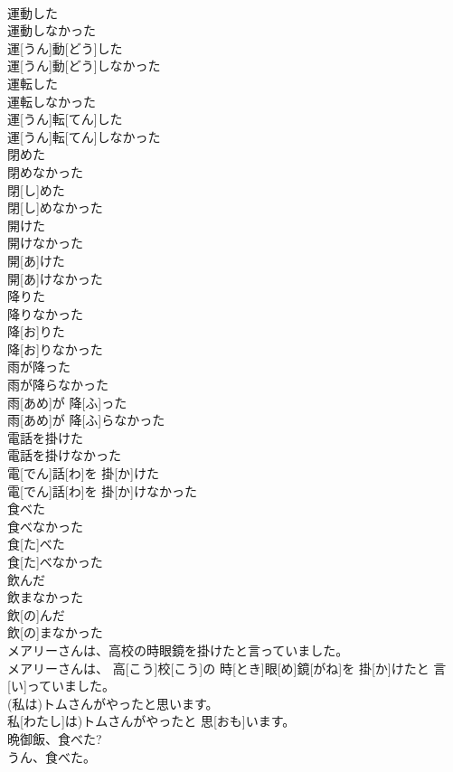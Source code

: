 \documentclass[8pt]{extreport}
\begin{document}
\begin{CJK}{UTF8}{min}
\\	運動した 
\\	運動しなかった	
\\	運[うん]動[どう]した 
\\	運[うん]動[どう]しなかった
\\	運転した 
\\	運転しなかった	
\\	運[うん]転[てん]した 
\\	運[うん]転[てん]しなかった
\\	閉めた 
\\	閉めなかった	
\\	閉[し]めた 
\\	閉[し]めなかった
\\	開けた 
\\	開けなかった	
\\	開[あ]けた 
\\	開[あ]けなかった
\\	降りた 
\\	降りなかった	
\\	降[お]りた 
\\	降[お]りなかった
\\	雨が降った 
\\	雨が降らなかった	
\\	雨[あめ]が 降[ふ]った 
\\	雨[あめ]が 降[ふ]らなかった
\\	電話を掛けた 
\\	電話を掛けなかった	
\\	電[でん]話[わ]を 掛[か]けた 
\\	電[でん]話[わ]を 掛[か]けなかった
\\	食べた 
\\	食べなかった	
\\	食[た]べた 
\\	食[た]べなかった
\\	飲んだ 
\\	飲まなかった	
\\	飲[の]んだ 
\\	飲[の]まなかった
\\	メアリーさんは、高校の時眼鏡を掛けたと言っていました。	
\\	メアリーさんは、 高[こう]校[こう]の 時[とき]眼[め]鏡[がね]を 掛[か]けたと 言[い]っていました。
\\	(私は)トムさんがやったと思います。	
\\	私[わたし]は)トムさんがやったと 思[おも]います。
\\	晩御飯、食べた? 
\\	うん、食べた。	

\end{CJK}
\end{document}
